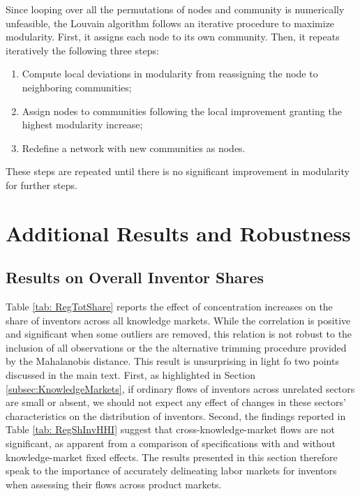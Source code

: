 Since looping over all the permutations of nodes and community is
numerically unfeasible, the Louvain algorithm follows an iterative
procedure to maximize modularity. First, it assigns each node to its
own community. Then, it repeats iteratively the following three steps:
\begin{enumerate}
\item Compute local deviations in modularity from reassigning the node to
neighboring communities;
\item Assign nodes to communities following the local improvement granting
the highest modularity increase;
\item Redefine a network with new communities as nodes.
\end{enumerate}
These steps are repeated until there is no significant improvement
in modularity for further steps.


\section{Additional Results and Robustness \label{app: Additional-Results-Rob}}


\subsection{Results on Overall Inventor Shares}

Table \ref{tab: RegTotShare} reports the effect of concentration
increases on the share of inventors across all knowledge markets.
While the correlation is positive and significant when some outliers
are removed, this relation is not robust to the inclusion of all observations
or the the alternative trimming procedure provided by the Mahalanobis
distance. This result is unsurprising in light fo two points discussed
in the main text. First, as highlighted in Section \ref{subsec:KnowledgeMarkets},
if ordinary flows of inventors across unrelated sectors are small
or absent, we should not expect any effect of changes in these sectors'
characteristics on the distribution of inventors. Second, the findings
reported in Table \ref{tab: RegShInvHHI} suggest that cross-knowledge-market
flows are not significant, as apparent from a comparison of specifications
with and without knowledge-market fixed effects. The results presented
in this section therefore speak to the importance of accurately delineating
labor markets for inventors when assessing their flows across product
markets.

